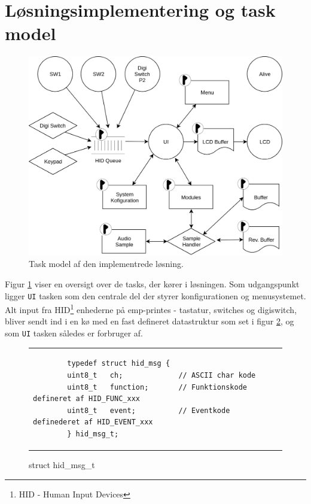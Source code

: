 \section{Løsningsimplementering og task model}
\begin{figure}[h]
	\centering
	\includegraphics[width=.9\linewidth]{billeder/taskmodel.png}
	\caption{Task model af den implementrede løsning.}
	\label{fig:taskmodel}
\end{figure}
Figur \ref{fig:taskmodel} viser en oversigt over de tasks, der kører i løsningen.
Som udgangspunkt ligger \texttt{UI} tasken som den centrale del der styrer konfigurationen og menusystemet.
Alt input fra HID\footnote{HID - Human Input Devices} enhederne på emp-printes - tastatur, switches og digiswitch, bliver sendt ind i en kø med en fast defineret datastruktur som set i figur \ref{fig:hid_msg_t}, og som \texttt{UI} tasken således er forbruger af.
\begin{figure}[h!]
\begin{tabular}{l}
	\begin{lstlisting}
		typedef struct hid_msg {
		uint8_t   ch;             // ASCII char kode
		uint8_t   function;       // Funktionskode defineret af HID_FUNC_xxx
		uint8_t   event;          // Eventkode definederet af HID_EVENT_xxx
		} hid_msg_t;
	\end{lstlisting}
\end{tabular}
\caption{struct hid\_msg\_t}
\label{fig:hid_msg_t}
\end{figure}


